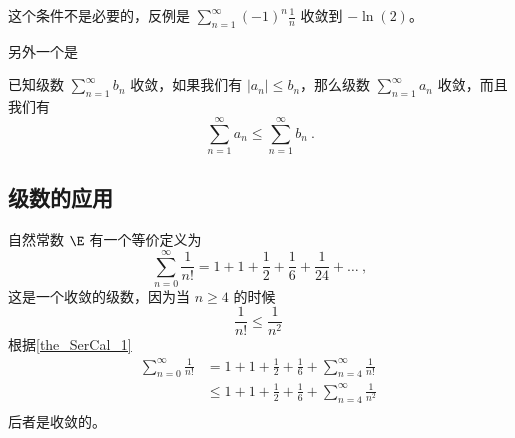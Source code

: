这个条件不是必要的，反例是 $\sum_{n = 1}^\infty (-1)^n\frac1{n}$ 收敛到 $-\ln(2)$。

另外一个是
\begin{theorem}{}\label{the_SerCal_1}
已知级数 $\sum_{n=1}^\infty b_n$ 收敛，如果我们有 $|a_n| \leq b_n$，那么级数 $\sum_{n=1}^\infty a_n$ 收敛，而且我们有
$$
\sum_{n=1}^\infty a_n \leq \sum_{n=1}^\infty b_n ~.
$$
\end{theorem}




\subsection{级数的应用}



自然常数 $\E$ 有一个等价定义为
\begin{equation}
\sum_{n=0}^\infty \frac{1}{n!} = 1 + 1 + \frac{1}{2} + \frac{1}{6} + \frac{1}{24} + \dots~,
\end{equation}
这是一个收敛的级数，因为当 $n \geq 4$ 的时候
$$
\frac1{n!} \leq \frac1{n^2}~
$$
根据\autoref{the_SerCal_1} 
$$
\begin{aligned}
\sum_{n=0}^\infty \frac{1}{n!} &= 1 + 1 + \frac{1}{2} + \frac{1}{6} + \sum_{n=4}^\infty \frac{1}{n!} \\
&\leq 1 + 1 + \frac{1}{2} + \frac{1}{6} + \sum_{n=4}^\infty \frac{1}{n^2} \\
\end{aligned}~
$$
后者是收敛的。
